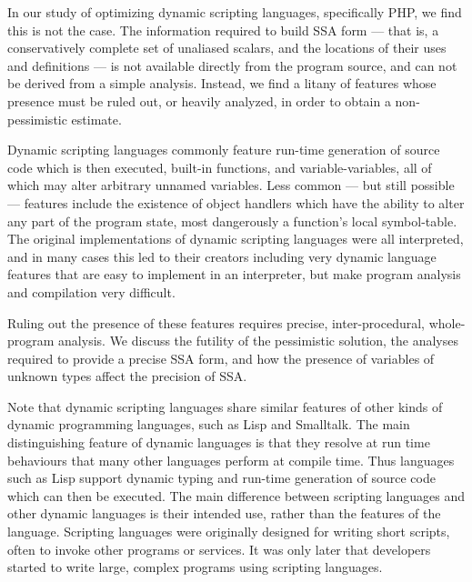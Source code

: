 In our study of optimizing dynamic scripting languages, specifically
PHP, we find this is not the case.  The information required to build
SSA form --- that is, a conservatively complete set of unaliased
scalars, and the locations of their uses and definitions --- is not
available directly from the program source, and can not be derived
from a simple analysis.  Instead, we find a litany of features whose
presence must be ruled out, or heavily analyzed, in order to obtain a
non-pessimistic estimate.

Dynamic scripting languages commonly feature run-time generation of
source code which is then executed, built-in functions, and
variable-variables, all of which may alter arbitrary unnamed
variables.  Less common --- but still possible --- features include
the existence of object handlers which have the ability to alter any
part of the program state, most dangerously a function's local
symbol-table.  The original implementations of dynamic scripting
languages were all interpreted, and in many cases this led to their
creators including very dynamic language features that are easy to
implement in an interpreter, but make program analysis and compilation
very difficult.

Ruling out the presence of these features requires precise,
inter-procedural, whole-program analysis.  We discuss the futility of
the pessimistic solution, the analyses required to provide a precise
SSA form, and how the presence of variables of unknown types affect
the precision of SSA.

Note that dynamic scripting languages share similar features of other
kinds of dynamic programming languages, such as Lisp and
Smalltalk. The main distinguishing feature of dynamic languages is
that they resolve at run time behaviours that many other languages
perform at compile time. Thus languages such as Lisp support dynamic
typing and run-time generation of source code which can then be
executed. The main difference between scripting languages and other
dynamic languages is their intended use, rather than the features of
the language. Scripting languages were originally designed for writing
short scripts, often to invoke other programs or services. It was only
later that developers started to write large, complex programs using
scripting languages.


